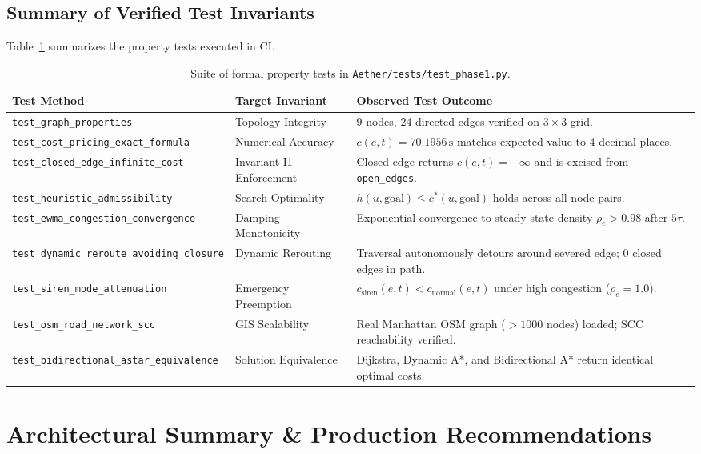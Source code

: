 \documentclass[10pt,a4paper]{article}
\begin{document}
\subsection{Summary of Verified Test Invariants}
Table~\ref{tab:tests} summarizes the property tests executed in CI.

\begin{table}[H]
\centering
\sffamily\scriptsize
\renewcommand{\arraystretch}{1.08}
\begin{tabularx}{\textwidth}{l l X}
\toprule
\textbf{Test Method} & \textbf{Target Invariant} & \textbf{Observed Test Outcome} \\
\midrule
\texttt{test\_graph\_properties} & Topology Integrity & 9 nodes, 24 directed edges verified on $3\times3$ grid. \\
\texttt{test\_cost\_pricing\_exact\_formula} & Numerical Accuracy & $c(e, t) = 70.1956\,\text{s}$ matches expected value to 4 decimal places. \\
\texttt{test\_closed\_edge\_infinite\_cost} & Invariant I1 Enforcement & Closed edge returns $c(e, t) = +\infty$ and is excised from \texttt{open\_edges}. \\
\texttt{test\_heuristic\_admissibility} & Search Optimality & $h(u, \text{goal}) \le c^*(u, \text{goal})$ holds across all node pairs. \\
\texttt{test\_ewma\_congestion\_convergence} & Damping Monotonicity & Exponential convergence to steady-state density $\rho_e > 0.98$ after $5\tau$. \\
\texttt{test\_dynamic\_reroute\_avoiding\_closure} & Dynamic Rerouting & Traversal autonomously detours around severed edge; $0$ closed edges in path. \\
\texttt{test\_siren\_mode\_attenuation} & Emergency Preemption & $c_{\text{siren}}(e, t) < c_{\text{normal}}(e, t)$ under high congestion ($\rho_e = 1.0$). \\
\texttt{test\_osm\_road\_network\_scc} & GIS Scalability & Real Manhattan OSM graph ($>1000$ nodes) loaded; SCC reachability verified. \\
\texttt{test\_bidirectional\_astar\_equivalence} & Solution Equivalence & Dijkstra, Dynamic A*, and Bidirectional A* return identical optimal costs. \\
\bottomrule
\end{tabularx}
\caption{Suite of formal property tests in \texttt{Aether/tests/test\_phase1.py}.}
\label{tab:tests}
\end{table}

\section{Architectural Summary \& Production Recommendations}
\end{document}
